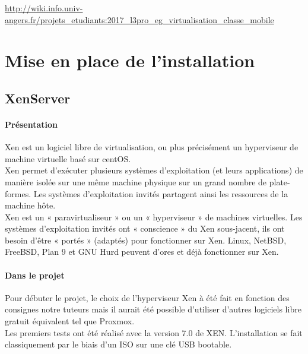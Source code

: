 \documentclass[a4paper,12pt]{extarticle}
\begin{document}
\url{http://wiki.info.univ-angers.fr/projets_etudiants:2017_l3pro_eg_virtualisation_classe_mobile}


\section{Mise en place de l'installation}
\subsection{XenServer}
\paragraph{Présentation\\}


Xen est un logiciel libre de virtualisation, ou plus précisément un hyperviseur de machine virtuelle basé sur centOS.\\

Xen permet d'exécuter plusieurs systèmes d'exploitation (et leurs applications) de manière isolée sur une même machine physique sur un grand nombre de plate-formes. Les systèmes d'exploitation invités partagent ainsi les ressources de la machine hôte.\\

Xen est un « paravirtualiseur » ou un « hyperviseur » de machines virtuelles. Les systèmes d'exploitation invités ont « conscience » du Xen sous-jacent, ils ont besoin d'être « portés » (adaptés) pour fonctionner sur Xen. Linux, NetBSD, FreeBSD, Plan 9 et GNU Hurd peuvent d'ores et déjà fonctionner sur Xen.\\

\paragraph{Dans le projet\\}

Pour débuter le projet, le choix de l’hyperviseur Xen à été fait en fonction des consignes notre tuteurs mais il aurait été possible d’utiliser d’autres logiciels libre gratuit équivalent tel que Proxmox. \\
Les premiers tests ont été réalisé avec la version 7.0 de XEN. L’installation se fait classiquement par le biais d’un ISO sur une clé USB bootable.
\end{document}
